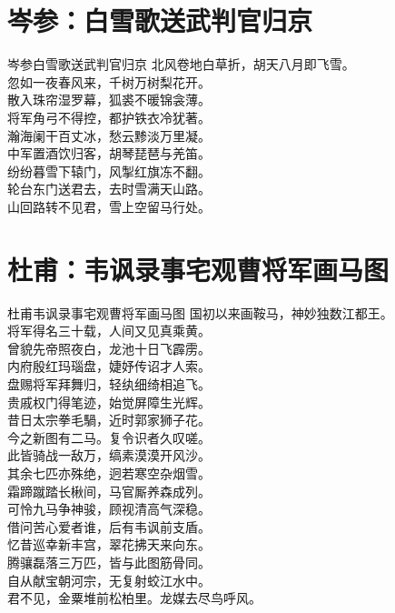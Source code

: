 \documentclass[12pt,oneside,a5paper]{book}
\begin{document}
\chapter{岑参：白雪歌送武判官归京}
\begin{poemzh}{岑参}{白雪歌送武判官归京}
北风卷地白草折，胡天八月即飞雪。\\
忽如一夜春风来，千树万树梨花开。\\
散入珠帘湿罗幕，狐裘不暖锦衾薄。\\
将军角弓不得控，都护铁衣冷犹著。\\
瀚海阑干百丈冰，愁云黪淡万里凝。\\
中军置酒饮归客，胡琴琵琶与羌笛。\\
纷纷暮雪下辕门，风掣红旗冻不翻。\\
轮台东门送君去，去时雪满天山路。\\
山回路转不见君，雪上空留马行处。\\ 
\end{poemzh}

\chapter{杜甫：韦讽录事宅观曹将军画马图}
\begin{poemzh}{杜甫}{韦讽录事宅观曹将军画马图}
国初以来画鞍马，神妙独数江都王。\\
将军得名三十载，人间又见真乘黄。\\
曾貌先帝照夜白，龙池十日飞霹雳。\\
内府殷红玛瑙盘，婕妤传诏才人索。\\
盘赐将军拜舞归，轻纨细绮相追飞。\\
贵戚权门得笔迹，始觉屏障生光辉。\\
昔日太宗拳毛騧，近时郭家狮子花。\\
今之新图有二马。复令识者久叹嗟。\\
此皆骑战一敌万，缟素漠漠开风沙。\\
其余七匹亦殊绝，迥若寒空杂烟雪。\\
霜蹄蹴踏长楸间，马官厮养森成列。\\
可怜九马争神骏，顾视清高气深稳。\\
借问苦心爱者谁，后有韦讽前支盾。\\
忆昔巡幸新丰宫，翠花拂天来向东。\\
腾骧磊落三万匹，皆与此图筋骨同。\\
自从献宝朝河宗，无复射蛟江水中。\\
君不见，金粟堆前松柏里。龙媒去尽鸟呼风。\\ 
\end{poemzh}
\end{document}
